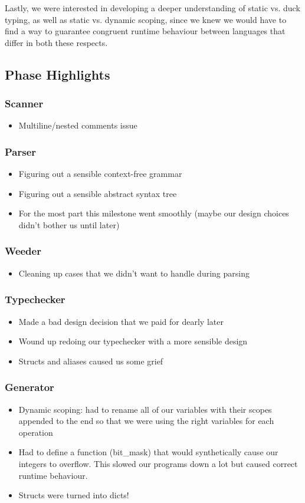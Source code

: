 \documentclass{article}
\begin{document}
Lastly, we were interested in developing a deeper understanding of static vs. duck typing, as well as static vs. dynamic scoping, since we knew we would have to find a way to guarantee congruent runtime behaviour between languages that differ in both these respects.
	
\subsection{Phase Highlights}

\subsubsection{Scanner}
\begin{itemize}
\item Multiline/nested comments issue
\end{itemize}
\subsubsection{Parser}
\begin{itemize}
\item Figuring out a sensible context-free grammar
\item Figuring out a sensible abstract syntax tree
\item For the most part this milestone went smoothly (maybe our design choices didn't bother us until later)
\end{itemize}
\subsubsection{Weeder}
\begin{itemize}
\item Cleaning up cases that we didn't want to handle during parsing
\end{itemize}
\subsubsection{Typechecker}
\begin{itemize}
\item Made a bad design decision that we paid for dearly later
\item Wound up redoing our typechecker with a more sensible design
\item Structs and aliases caused us some grief
\end{itemize}
\subsubsection{Generator}
\begin{itemize}
\item Dynamic scoping: had to rename all of our variables with their scopes appended to the end so that we were using the right variables for each operation
\item Had to define a function (bit\_mask) that would synthetically cause our integers to overflow. This slowed our programs down a lot but caused correct runtime behaviour.
\item Structs were turned into dicts!
\end{itemize}
\end{document}

